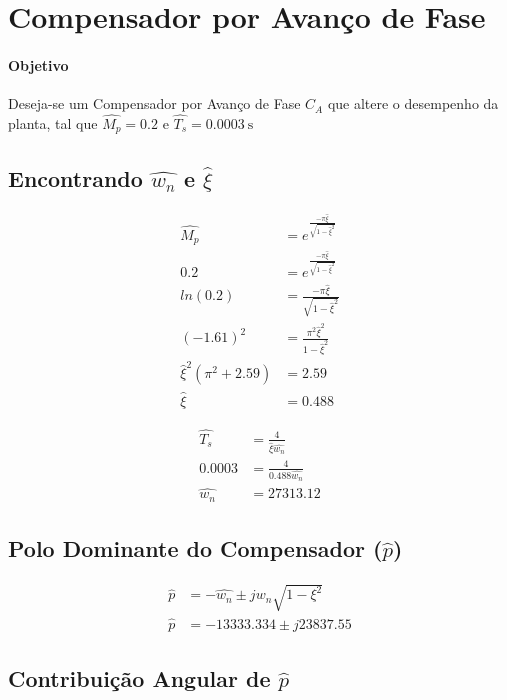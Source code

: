 \documentclass[a4paper]{article}
\begin{document}
	\section{Compensador por Avanço de Fase}
	\paragraph{Objetivo} Deseja-se um Compensador por Avanço de Fase $C_A$ que altere o desempenho da planta, tal que $\hat{M_p} = 0.2$ e $\hat{T_s} = \SI{0.0003}{\second}$
	
	\vspace{0.5em}
	\subsection{Encontrando $\hat{w_n}$ e $\hat{\xi}$}
	\begin{align}
	\hat{M_p} &= e^{\frac{-\pi\hat{\xi}}{\sqrt{1-\hat{\xi}^2}}} \\
	0.2 &= e^{\frac{-\pi\hat{\xi}}{\sqrt{1-\hat{\xi}^2}}} \\
	ln(0.2) &= \frac{-\pi\hat{\xi}}{\sqrt{1-\hat{\xi}^2}} \\
	(-1.61)^2 &= \frac{\pi^2\hat{\xi}^2}{1-\hat{\xi}^2} \\
	\hat{\xi}^2(\pi^2+2.59) &= 2.59\\
	\hat{\xi}&= 0.488
	\end{align}  
	
	\vspace{0.5em}
	\begin{align}
	\hat{T_s} &= \frac{4}{\hat{\xi} \hat{w_n}} \\
	0.0003 &= \frac{4}{0.488\hat{w_n}} \\
	\hat{w_n} &= 27 313.12
	\end{align}
	
	\subsection{Polo Dominante do Compensador ($\hat{p}$)}
	\begin{align}
	\hat{p} &= -\hat{w_n}\pm jw_n\sqrt{1-\xi^2}\\
	\hat{p} &= -13333.334 \pm j23837.55
	\end{align}
	\vspace{0.5em}
	
	\subsection{Contribuição Angular de $\hat{p}$}
	
\end{document}
